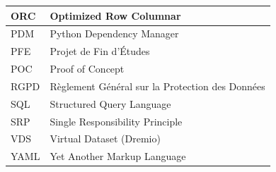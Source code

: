 \begin{longtable}{|l|p{12cm}|}
    ORC & Optimized Row Columnar \\ \hline
    PDM & Python Dependency Manager \\ \hline
    PFE & Projet de Fin d'Études \\ \hline
    POC & Proof of Concept \\ \hline
    RGPD & Règlement Général sur la Protection des Données \\ \hline
    SQL & Structured Query Language \\ \hline
    SRP & Single Responsibility Principle \\ \hline
    VDS & Virtual Dataset (Dremio) \\ \hline
    YAML & Yet Another Markup Language \\ \hline
\end{longtable}
